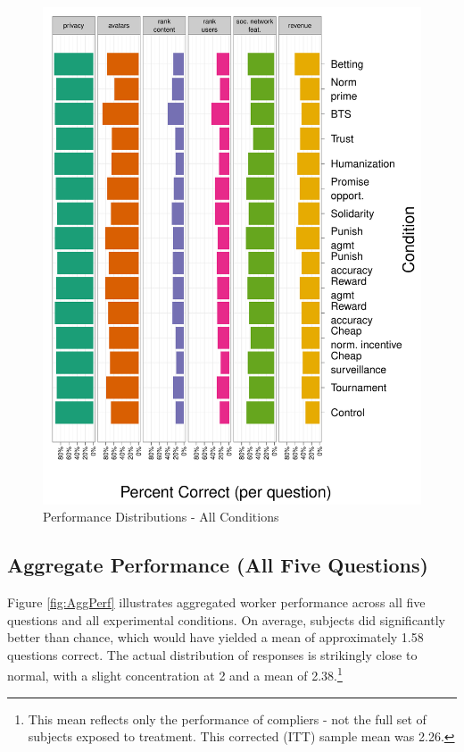 \documentclass{cscw2010}
\begin{document}
\begin{figure} 
\centering 
\caption{Performance Distributions - All Conditions \label{fig:per_q}}
\includegraphics[scale=.37]{../images/per_q}
\end{figure} 

\subsection{Aggregate Performance (All Five Questions)}

Figure \ref{fig:AggPerf} illustrates aggregated worker performance
across all five questions and all experimental conditions. On average,
subjects did significantly better than chance, which would have yielded
a mean of approximately 1.58 questions correct.  The actual
distribution of responses is strikingly close to normal, with a slight
concentration at 2 and a mean of 2.38.\footnote{This mean reflects
  only the performance of compliers - not the full set of subjects
  exposed to treatment. This corrected (ITT) sample mean was 2.26.}
\end{document}
